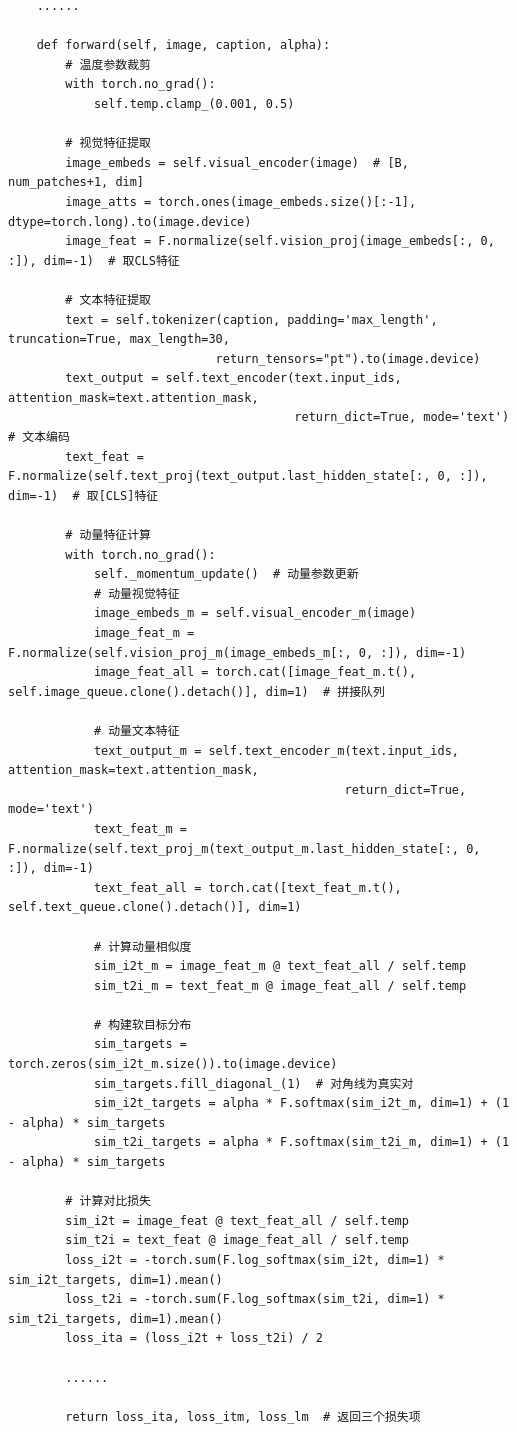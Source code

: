 \documentclass[zihao=false,fontset=windows]{ctexart}
\begin{document}
\begin{feishucode}
\begin{lstlisting}
    ......
        
    def forward(self, image, caption, alpha):
        # 温度参数裁剪
        with torch.no_grad():
            self.temp.clamp_(0.001, 0.5)
        
        # 视觉特征提取
        image_embeds = self.visual_encoder(image)  # [B, num_patches+1, dim]
        image_atts = torch.ones(image_embeds.size()[:-1], dtype=torch.long).to(image.device)
        image_feat = F.normalize(self.vision_proj(image_embeds[:, 0, :]), dim=-1)  # 取CLS特征
        
        # 文本特征提取
        text = self.tokenizer(caption, padding='max_length', truncation=True, max_length=30, 
                             return_tensors="pt").to(image.device)
        text_output = self.text_encoder(text.input_ids, attention_mask=text.attention_mask,
                                        return_dict=True, mode='text')  # 文本编码
        text_feat = F.normalize(self.text_proj(text_output.last_hidden_state[:, 0, :]), dim=-1)  # 取[CLS]特征

        # 动量特征计算
        with torch.no_grad():
            self._momentum_update()  # 动量参数更新
            # 动量视觉特征
            image_embeds_m = self.visual_encoder_m(image)
            image_feat_m = F.normalize(self.vision_proj_m(image_embeds_m[:, 0, :]), dim=-1)
            image_feat_all = torch.cat([image_feat_m.t(), self.image_queue.clone().detach()], dim=1)  # 拼接队列
            
            # 动量文本特征
            text_output_m = self.text_encoder_m(text.input_ids, attention_mask=text.attention_mask,
                                               return_dict=True, mode='text')
            text_feat_m = F.normalize(self.text_proj_m(text_output_m.last_hidden_state[:, 0, :]), dim=-1)
            text_feat_all = torch.cat([text_feat_m.t(), self.text_queue.clone().detach()], dim=1)

            # 计算动量相似度
            sim_i2t_m = image_feat_m @ text_feat_all / self.temp
            sim_t2i_m = text_feat_m @ image_feat_all / self.temp

            # 构建软目标分布
            sim_targets = torch.zeros(sim_i2t_m.size()).to(image.device)
            sim_targets.fill_diagonal_(1)  # 对角线为真实对
            sim_i2t_targets = alpha * F.softmax(sim_i2t_m, dim=1) + (1 - alpha) * sim_targets
            sim_t2i_targets = alpha * F.softmax(sim_t2i_m, dim=1) + (1 - alpha) * sim_targets

        # 计算对比损失
        sim_i2t = image_feat @ text_feat_all / self.temp
        sim_t2i = text_feat @ image_feat_all / self.temp
        loss_i2t = -torch.sum(F.log_softmax(sim_i2t, dim=1) * sim_i2t_targets, dim=1).mean()
        loss_t2i = -torch.sum(F.log_softmax(sim_t2i, dim=1) * sim_t2i_targets, dim=1).mean()
        loss_ita = (loss_i2t + loss_t2i) / 2
        
        ......
        
        return loss_ita, loss_itm, loss_lm  # 返回三个损失项
\end{lstlisting}
\end{feishucode}
\end{document}
